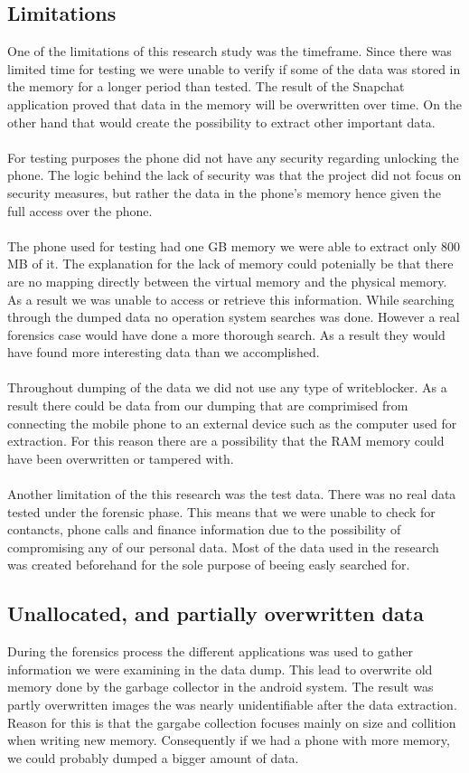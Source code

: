 \subsection{Limitations}
One of the limitations of this research study was the timeframe. Since there was limited time for testing we were unable to verify if some of the data was stored in the memory for a longer period than tested. The result of the Snapchat application proved that data in the memory will be overwritten over time. On the other hand that would create the possibility to extract other important data. \\\\
For testing purposes the phone did not have any security regarding unlocking the phone. The logic behind the lack of security was that the project did not focus on security measures, but rather the data in the phone's memory hence given the full access over the phone. \\\\
The phone used for testing had one GB memory we were able to extract only 800 MB of it. The explanation for the lack of memory could potenially be that there are no mapping directly between the virtual memory and the physical memory. As a result we was unable to access or retrieve this information. While searching through the dumped data no operation system searches was done. However a real forensics case would have done a more thorough search. As a result they would have found more interesting data than we accomplished. \\\\
Throughout dumping of the data we did not use any type of writeblocker. As a result there could be data from our dumping that are comprimised from connecting the mobile phone to an external device such as the computer used for extraction. For this reason there are a possibility that the RAM memory could have been overwritten or tampered with. \\\\
Another limitation of the this research was the test data. There was no real data tested under the forensic phase. This means that we were unable to check for contancts, phone calls and finance information due to the possibility of compromising any of our personal data. Most of the data used in the research was created beforehand for the sole purpose of beeing easly searched for. 
\subsection{Unallocated, and partially overwritten data}
During the forensics process the different applications was used to gather information we were examining in the data dump. This lead to overwrite old memory done by the garbage collector in the android system. The result was partly overwritten images the was nearly unidentifiable after the data extraction. Reason for this is that the gargabe collection focuses mainly on size and collition when writing new memory. Consequently if we had a phone with more memory, we could probably dumped a bigger amount of data.
